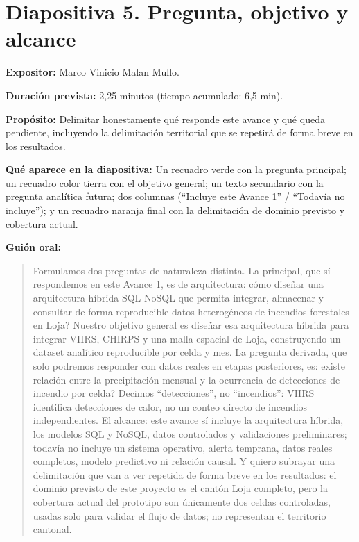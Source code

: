 \documentclass[11pt,a4paper]{article}
\newcommand{\campo}[2]{\par\medskip\noindent\textbf{#1:} #2\par}
\newenvironment{guionoral}{%
  \medskip\noindent\textbf{Gui\'on oral:}\par\smallskip
  \begin{quote}\small
}{%
  \end{quote}
}
\newcommand{\separadordiapositiva}{\bigskip\noindent{\color{Tierra!60}\hrulefill}\bigskip}
\begin{document}
\separadordiapositiva

\section*{Diapositiva 5. Pregunta, objetivo y alcance}

\campo{Expositor}{Marco Vinicio Malan Mullo.}
\campo{Duraci\'on prevista}{2,25 minutos (tiempo acumulado: 6,5 min).}
\campo{Prop\'osito}{Delimitar honestamente qu\'e responde este avance y
qu\'e queda pendiente, incluyendo la delimitaci\'on territorial que se
repetir\'a de forma breve en los resultados.}
\campo{Qu\'e aparece en la diapositiva}{Un recuadro verde con la
pregunta principal; un recuadro color tierra con el objetivo general;
un texto secundario con la pregunta anal\'itica futura; dos columnas
(``Incluye este Avance 1'' / ``Todav\'ia no incluye''); y un recuadro
naranja final con la delimitaci\'on de dominio previsto y cobertura
actual.}

\begin{guionoral}
Formulamos dos preguntas de naturaleza distinta. La principal, que s\'i
respondemos en este Avance 1, es de arquitectura: \textquestiondown
c\'omo dise\~nar una arquitectura h\'ibrida SQL-NoSQL que permita
integrar, almacenar y consultar de forma reproducible datos
heterog\'eneos de incendios forestales en Loja? Nuestro objetivo
general es dise\~nar esa arquitectura h\'ibrida para integrar VIIRS,
CHIRPS y una malla espacial de Loja, construyendo un dataset
anal\'itico reproducible por celda y mes. La pregunta derivada, que
solo podremos responder con datos reales en etapas posteriores, es:
\textquestiondown existe relaci\'on entre la precipitaci\'on mensual y
la ocurrencia de detecciones de incendio por celda? Decimos
``detecciones'', no ``incendios'': VIIRS identifica detecciones de
calor, no un conteo directo de incendios independientes. El alcance:
este avance s\'i incluye la arquitectura h\'ibrida, los modelos SQL y
NoSQL, datos controlados y validaciones preliminares; todav\'ia no
incluye un sistema operativo, alerta temprana, datos reales completos,
modelo predictivo ni relaci\'on causal. Y quiero subrayar una
delimitaci\'on que van a ver repetida de forma breve en los
resultados: el dominio previsto de este proyecto es el cant\'on Loja
completo, pero la cobertura actual del prototipo son \'unicamente dos
celdas controladas, usadas solo para validar el flujo de datos; no
representan el territorio cantonal.
\end{guionoral}
\end{document}
